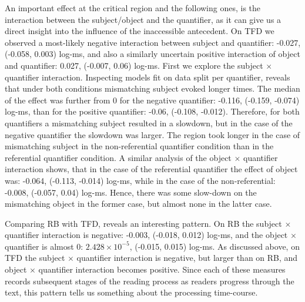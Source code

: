An important effect at the critical region and the following ones, is the
interaction between the subject/object and the quantifier, as it can give us a direct
insight into the influence of the inaccessible antecedent. On TFD we observed a most-likely negative interaction between subject and quantifier: -0.027, (-0.058, 0.003) log-ms, and also a similarly uncertain positive interaction of object and quantifier: 0.027, (-0.007, 0.06) log-ms.
First we explore the subject $\times$ quantifier interaction. Inspecting models fit on data split per quantifier, reveals that under both conditions mismatching subject evoked longer times.
The median of the effect was further from 0 for the negative quantifier: -0.116, (-0.159, -0.074) log-ms, than for the positive quantifier: -0.06, (-0.108, -0.012).
Therefore, for both quantifiers a mismatching subject resulted in a slowdown, but in the case of the negative quantifier the slowdown was larger.  The region took longer in the case of mismatching subject in the non-referential quantifier condition than in the referential quantifier condition.
A similar analysis of the object $\times$ quantifier interaction shows, that in the case of the referential quantifier the effect of object was: -0.064, (-0.113, -0.014) log-ms, while in the case of the non-referential: -0.008, (-0.057, 0.04) log-ms. Hence, there was some slow-down on the mismatching object in the former case, but almost none in the latter case.

Comparing RB with TFD, reveals an interesting pattern. On RB the subject $\times$ quantifier interaction is negative: -0.003, (-0.018, 0.012) log-ms, and the object $\times$ quantifier is almost 0: \ensuremath{2.428\times 10^{-5}}, (-0.015, 0.015) log-ms.
As discussed above, on TFD the subject $\times$ quantifier interaction is negative, but larger than on RB, and object $\times$ quantifier interaction becomes positive. Since each of these measures records subsequent stages of the reading process as readers progress through the text, this pattern tells us something about the processing time-course.


